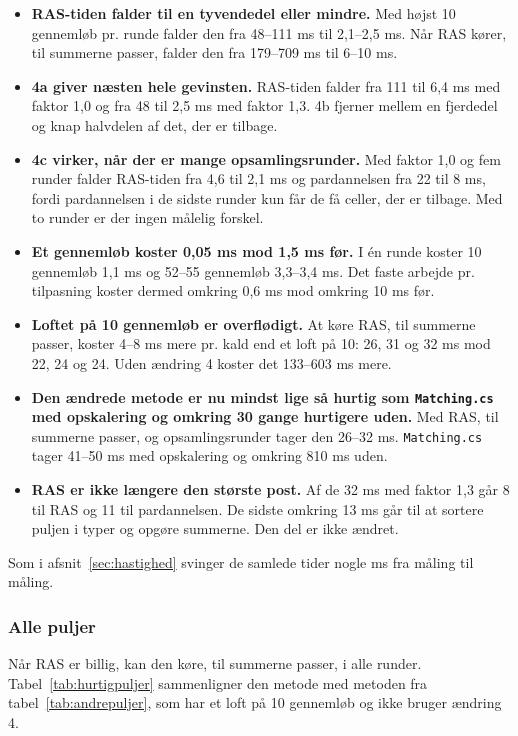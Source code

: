 \documentclass[11pt,a4paper]{article}
\newcommand{\kode}[1]{\texttt{#1}}
\begin{document}
\begin{itemize}
\item \textbf{RAS-tiden falder til en tyvendedel eller mindre.} Med højst 10 gennemløb pr. runde
falder den fra 48--111 ms til 2,1--2,5 ms. Når RAS kører, til summerne passer, falder den fra
179--709 ms til 6--10 ms.
\item \textbf{4a giver næsten hele gevinsten.} RAS-tiden falder fra 111 til 6,4 ms med faktor 1,0 og
fra 48 til 2,5 ms med faktor 1,3. 4b fjerner mellem en fjerdedel og knap halvdelen af det, der er
tilbage.
\item \textbf{4c virker, når der er mange opsamlingsrunder.} Med faktor 1,0 og fem runder falder
RAS-tiden fra 4,6 til 2,1 ms og pardannelsen fra 22 til 8 ms, fordi pardannelsen i de sidste runder
kun får de få celler, der er tilbage. Med to runder er der ingen målelig forskel.
\item \textbf{Et gennemløb koster 0,05 ms mod 1,5 ms før.} I én runde koster 10 gennemløb 1,1 ms og
52--55 gennemløb 3,3--3,4 ms. Det faste arbejde pr. tilpasning koster dermed omkring 0,6 ms mod
omkring 10 ms før.
\item \textbf{Loftet på 10 gennemløb er overflødigt.} At køre RAS, til summerne passer, koster 4--8 ms
mere pr. kald end et loft på 10: 26, 31 og 32 ms mod 22, 24 og 24. Uden ændring 4 koster det
133--603 ms mere.
\item \textbf{Den ændrede metode er nu mindst lige så hurtig som \kode{Matching.cs} med opskalering
og omkring 30 gange hurtigere uden.} Med RAS, til summerne passer, og opsamlingsrunder tager den
26--32 ms. \kode{Matching.cs} tager 41--50 ms med opskalering og omkring 810 ms uden.
\item \textbf{RAS er ikke længere den største post.} Af de 32 ms med faktor 1,3 går 8 til RAS og 11
til pardannelsen. De sidste omkring 13 ms går til at sortere puljen i typer og opgøre summerne. Den
del er ikke ændret.
\end{itemize}

Som i afsnit~\ref{sec:hastighed} svinger de samlede tider nogle ms fra måling til måling.

\subsubsection*{Alle puljer}

Når RAS er billig, kan den køre, til summerne passer, i alle runder.
Tabel~\ref{tab:hurtigpuljer} sammenligner den metode med metoden fra tabel~\ref{tab:andrepuljer},
som har et loft på 10 gennemløb og ikke bruger ændring 4.
\end{document}
